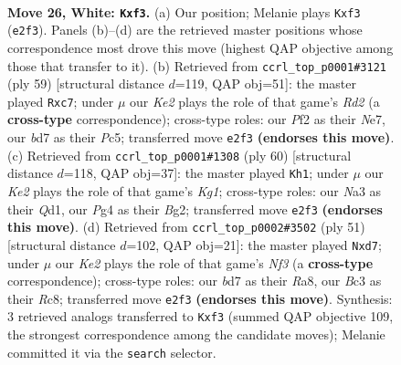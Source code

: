 \documentclass[11pt]{article}
\begin{document}
\clearpage

\begin{figure}[p]\centering
\begin{subfigure}{0.46\textwidth}\centering
\resizebox{\linewidth}{!}{%
\newchessgame
\chessboard[
  setfen={r3r3/1ppb2kp/5p2/p2p2b1/6P1/NPB1Pn2/P3KP2/RNq5 w - - 0 26},
  showmover=false,
  pgfstyle=straightmove, color=movearrow, markmove={e2-f3}
]}
\caption{}
\end{subfigure}\hfill
\begin{subfigure}{0.46\textwidth}\centering
\resizebox{\linewidth}{!}{%
\newchessgame
\chessboard[
  setfen={8/1pNrnkp1/1p3p2/2p2b2/2P4p/2BnKPP1/PP5P/3R1B2 b - - 4 30},
  showmover=false,
  pgfstyle=straightmove, color=movearrow, markmove={d7-c7}
]}
\caption{}
\end{subfigure}
\\[4pt]
\begin{subfigure}{0.46\textwidth}\centering
\resizebox{\linewidth}{!}{%
\newchessgame
\chessboard[
  setfen={r3r1k1/pp4b1/3pP2p/P4p2/1P6/4q1P1/4N1BP/3QR1K1 w - - 0 31},
  showmover=false,
  pgfstyle=straightmove, color=movearrow, markmove={g1-h1}
]}
\caption{}
\end{subfigure}\hfill
\begin{subfigure}{0.46\textwidth}\centering
\resizebox{\linewidth}{!}{%
\newchessgame
\chessboard[
  setfen={r1r3k1/1p1Q1pbp/p4np1/2P5/1Pp2Pn1/8/P3B1PP/4RRBK b - - 0 26},
  showmover=false,
  pgfstyle=straightmove, color=movearrow, markmove={f6-d7}
]}
\caption{}
\end{subfigure}
\caption{\textbf{Move 26, White: \texttt{Kxf3}.} (a) Our position; Melanie plays \texttt{Kxf3} (\texttt{e2f3}). Panels (b)--(d) are the retrieved master positions whose correspondence most drove this move (highest QAP objective among those that transfer to it). (b) Retrieved from \texttt{ccrl\_top\_p0001\#3121} (ply 59) [structural distance $d$=119, QAP obj=51]: the master played \texttt{Rxc7}; under $\mu$ our \emph{Ke2} plays the role of that game's \emph{Rd2} (a \textbf{cross-type} correspondence); cross-type roles: our \emph{P}f2 as their \emph{N}e7, our \emph{b}d7 as their \emph{P}c5; transferred move \texttt{e2f3} \textbf{(endorses this move)}. (c) Retrieved from \texttt{ccrl\_top\_p0001\#1308} (ply 60) [structural distance $d$=118, QAP obj=37]: the master played \texttt{Kh1}; under $\mu$ our \emph{Ke2} plays the role of that game's \emph{Kg1}; cross-type roles: our \emph{N}a3 as their \emph{Q}d1, our \emph{P}g4 as their \emph{B}g2; transferred move \texttt{e2f3} \textbf{(endorses this move)}. (d) Retrieved from \texttt{ccrl\_top\_p0002\#3502} (ply 51) [structural distance $d$=102, QAP obj=21]: the master played \texttt{Nxd7}; under $\mu$ our \emph{Ke2} plays the role of that game's \emph{Nf3} (a \textbf{cross-type} correspondence); cross-type roles: our \emph{b}d7 as their \emph{R}a8, our \emph{B}c3 as their \emph{R}c8; transferred move \texttt{e2f3} \textbf{(endorses this move)}. Synthesis: 3 retrieved analogs transferred to \texttt{Kxf3} (summed QAP objective 109, the strongest correspondence among the candidate moves); Melanie committed it via the \texttt{search} selector.}
\label{fig:thought-m50}
\end{figure}
\end{document}
